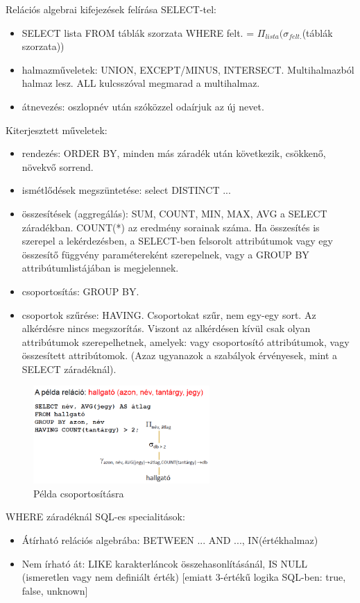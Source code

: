 \documentclass[margin=0px]{article}
\begin{document}
	Relációs algebrai kifejezések felírása SELECT-tel:
	\begin{itemize}
		\item SELECT lista FROM táblák szorzata WHERE felt. = $\Pi_{lista}(\sigma_{felt.}$(táblák szorzata))
		\item halmazműveletek: UNION, EXCEPT/MINUS, INTERSECT. Multihalmazból halmaz lesz. ALL kulcsszóval megmarad a multihalmaz.
		\item átnevezés: oszlopnév után szóközzel odaírjuk az új nevet.
	\end{itemize}
	Kiterjesztett műveletek:
	\begin{itemize}
		\item rendezés: ORDER BY, minden más záradék után következik, csökkenő, növekvő sorrend.
		\item ismétlődések megszüntetése: select DISTINCT ...
		\item összesítések (aggregálás): SUM, COUNT, MIN, MAX, AVG a SELECT záradékban. COUNT(*) az eredmény sorainak száma. Ha összesítés is szerepel a lekérdezésben, a SELECT-ben felsorolt attribútumok vagy egy összesítő függvény paramétereként szerepelnek, vagy a GROUP BY attribútumlistájában is megjelennek.
		\item csoportosítás: GROUP BY. 
		\item csoportok szűrése: HAVING. Csoportokat szűr, nem egy-egy sort. Az alkérdésre nincs megszorítás. Viszont az alkérdésen kívül csak olyan attribútumok szerepelhetnek, amelyek: vagy csoportosító attribútumok, vagy összesített attribútomok. (Azaz ugyanazok a szabályok érvényesek, mint a SELECT záradéknál).
	\end{itemize}
	\begin{figure}[H]
		\centering
		\includegraphics[width=0.6\textwidth]{img/sql2.png}
		\caption{Példa csoportosításra}
	\end{figure}
	WHERE záradéknál SQL-es specialitások:
	\begin{itemize}
		\item Átírható relációs algebrába: BETWEEN ... AND ..., IN(értékhalmaz)
		\item Nem írható át: LIKE karakterláncok összehasonlításánál, IS NULL (ismeretlen vagy nem definiált érték) [emiatt 3-értékű logika SQL-ben: true, false, unknown]
	\end{itemize}
\end{document}

